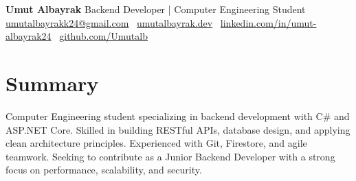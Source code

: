 \documentclass[10pt,a4paper]{extarticle}
\begin{document}
\begin{center}
    \begin{minipage}{\textwidth}
        \centering
        {\LARGE\textbf{Umut Albayrak}} \hspace{2pt} {\large{Backend Developer | Computer Engineering Student}}\\[10pt]
        \href{mailto:umutalbayrakk24@gmail.com}{umutalbayrakk24@gmail.com} \textbullet\
        \href{https://umutalbayrak.dev}{umutalbayrak.dev} \textbullet\
        \href{https://linkedin.com/in/umut-albayrak24}{linkedin.com/in/umut-albayrak24} \textbullet\
        \href{https://github.com/Umutalb}{github.com/Umutalb}
    \end{minipage}
\end{center}
\section{Summary}
Computer Engineering student specializing in backend development with C\# and ASP.NET Core. Skilled in building RESTful APIs, database design, and applying clean architecture principles. Experienced with Git, Firestore, and agile teamwork. Seeking to contribute as a Junior Backend Developer with a strong focus on performance, scalability, and security.
\end{document}
